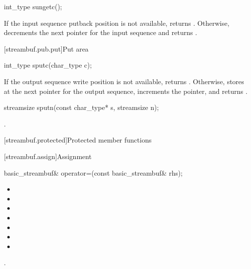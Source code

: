 %
\begin{itemdecl}
int_type sungetc();
\end{itemdecl}

\begin{itemdescr}
\pnum
\effects
If the input sequence putback position is not available,
returns
.
Otherwise, decrements the next pointer for the input sequence and
returns
.
\end{itemdescr}

[streambuf.pub.put]{Put area}

%
\begin{itemdecl}
int_type sputc(char_type c);
\end{itemdecl}

\begin{itemdescr}
\pnum
\effects
If the output sequence write position is not available,
returns
.
Otherwise, stores  at the next pointer for the output sequence,
increments the pointer, and
returns
.
\end{itemdescr}

%
\begin{itemdecl}
streamsize sputn(const char_type* s, streamsize n);
\end{itemdecl}

\begin{itemdescr}
\pnum
\returns
{}.
\end{itemdescr}

[streambuf.protected]{Protected member functions}

[streambuf.assign]{Assignment}

%
\begin{itemdecl}
basic_streambuf& operator=(const basic_streambuf& rhs);
\end{itemdecl}

\begin{itemdescr}
\pnum
\ensures
\begin{itemize}
\item {}
\item {}
\item {}
\item {}
\item {}
\item {}
\item {}
\end{itemize}

\pnum
\returns
{}.
\end{itemdescr}

